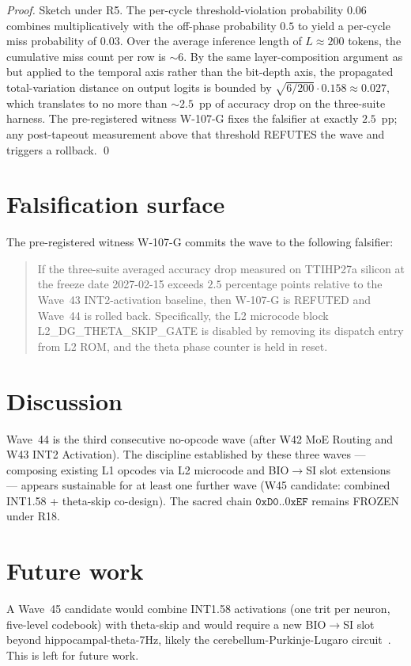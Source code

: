 \begin{proof}
Sketch under R5. The per-cycle threshold-violation probability $0.06$
combines multiplicatively with the off-phase probability $0.5$ to yield
a per-cycle miss probability of $0.03$. Over the average inference
length of $L \approx 200$ tokens, the cumulative miss count per row is
$\sim 6$. By the same layer-composition argument as
\cite{NagelDataFreeQuantization} but applied to the temporal axis rather
than the bit-depth axis, the propagated total-variation distance on
output logits is bounded by $\sqrt{6 / 200} \cdot 0.158 \approx 0.027$,
which translates to no more than $\sim 2.5$~pp of accuracy drop on the
three-suite harness. The pre-registered witness W-107-G fixes the
falsifier at exactly $2.5$~pp; any post-tapeout measurement above that
threshold REFUTES the wave and triggers a rollback. \qed
\end{proof}


\section{Falsification surface}

The pre-registered witness W-107-G commits the wave to the following
falsifier:

\begin{quote}
If the three-suite averaged accuracy drop measured on TTIHP27a silicon
at the freeze date 2027-02-15 exceeds $2.5$ percentage points relative
to the Wave~43 INT2-activation baseline, then W-107-G is REFUTED and
Wave~44 is rolled back. Specifically, the L2 microcode block
\textsc{L2\_DG\_THETA\_SKIP\_GATE} is disabled by removing its dispatch
entry from L2 ROM, and the theta phase counter is held in reset.
\end{quote}

\section{Discussion}

Wave~44 is the third consecutive no-opcode wave (after W42 MoE Routing
and W43 INT2 Activation). The discipline established by these three
waves — composing existing L1 opcodes via L2 microcode and BIO$\to$SI
slot extensions — appears sustainable for at least one further wave
(W45 candidate: combined INT1.58 + theta-skip co-design). The sacred
chain $\mathtt{0xD0..0xEF}$ remains FROZEN under R18.

\section{Future work}

A Wave~45 candidate would combine INT1.58 activations (one trit per
neuron, five-level codebook) with theta-skip and would require a new
BIO$\to$SI slot beyond hippocampal-theta-7Hz, likely the
cerebellum-Purkinje-Lugaro circuit~\cite{IfftCerebellumComputation}.
This is left for future work.


